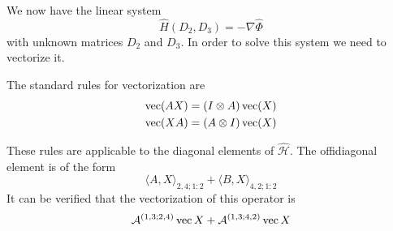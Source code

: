 We now have the linear system 
\begin{equation}
\hat{{H}}(D{_2}, D{_3}) = -\nabla \hat{\Phi}
\end{equation}
with unknown matrices $D{_2}$ and $D{_3}$. In order to solve this system
we need to vectorize it.

The standard rules for vectorization are
\begin{eqnarray*}
\operatorname*{vec}(AX) = (I \otimes A) \operatorname*{vec}(X) \\
\operatorname*{vec}(XA) = (A \otimes I) \operatorname*{vec}(X)
\end{eqnarray*}

These rules are applicable to the diagonal elements of $\hat{\mathcal{H}}$. The offidiagonal element
is of the form
\begin{equation}
\langle A, X \rangle _{2,4;1:2} + \langle B, X \rangle_{4,2;1:2}
\end{equation}
It can be verified that the vectorization of this operator is
\begin{equation}
\mathcal{A}^{(1,3;2,4)} \operatorname*{vec}{X} + \mathcal{A}^{(1,3;4,2)} \operatorname*{vec}{X}
\end{equation}
